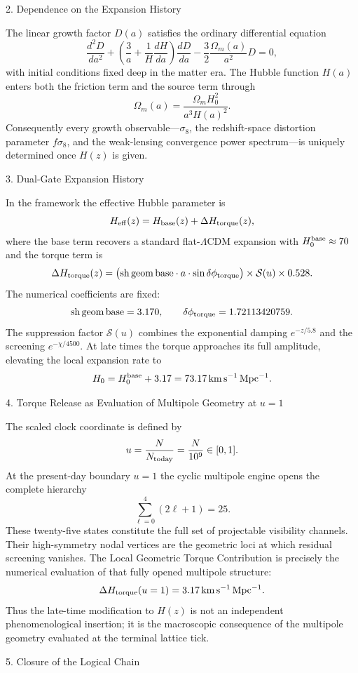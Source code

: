 2. Dependence on the Expansion History

The linear growth factor \(D(a)\) satisfies the ordinary differential equation
\[
\frac{d^2D}{da^2}+\left(\frac{3}{a}+\frac{1}{H}\frac{dH}{da}\right)\frac{dD}{da}-\frac{3}{2}\frac{\Omega_m(a)}{a^2}D=0,
\]  
with initial conditions fixed deep in the matter era. The Hubble function \(H(a)\) enters both the friction term and the source term through
\[
\Omega_m(a)=\frac{\Omega_m H_0^2}{a^3H(a)^2}.
\]  
Consequently every growth observable—\(\sigma_8\), the redshift-space distortion parameter \(f\sigma_8\), and the weak-lensing convergence power spectrum—is uniquely determined once \(H(z)\) is given.

3. Dual-Gate Expansion History

In the framework the effective Hubble parameter is
\[
H_{\rm eff}(z)=H_{\rm base}(z)+\Delta H_{\rm torque}(z),
\]  
where the base term recovers a standard flat-\(\Lambda\)CDM expansion with \(H_0^{\rm base}\approx70\) and the torque term is
\[
\Delta H_{\rm torque}(z)=\bigl({\rm sh\,geom\,base}\cdot a\cdot\sin\delta\phi_{\rm torque}\bigr)\times\mathcal{S}(u)\times0.528.
\]  
The numerical coefficients are fixed:
\[
{\rm sh\,geom\,base}=3.170,\qquad\delta\phi_{\rm torque}=1.72113420759.
\]  
The suppression factor \(\mathcal{S}(u)\) combines the exponential damping \(e^{-z/5.8}\) and the screening \(e^{-\chi/4500}\). At late times the torque approaches its full amplitude, elevating the local expansion rate to
\[
H_0=H_0^{\rm base}+3.17=73.17\,\mathrm{km\,s^{-1}\,Mpc^{-1}}.
\]

4. Torque Release as Evaluation of Multipole Geometry at \(u=1\)

The scaled clock coordinate is defined by
\[
u=\frac{N}{N_{\rm today}}=\frac{N}{10^9}\in[0,1].
\]  
At the present-day boundary \(u=1\) the cyclic multipole engine opens the complete hierarchy
\[
\sum_{\ell=0}^{4}(2\ell+1)=25.
\]  
These twenty-five states constitute the full set of projectable visibility channels. Their high-symmetry nodal vertices are the geometric loci at which residual screening vanishes. The Local Geometric Torque Contribution is precisely the numerical evaluation of that fully opened multipole structure:
\[
\Delta H_{\rm torque}(u=1)=3.17\,\mathrm{km\,s^{-1}\,Mpc^{-1}}.
\]  
Thus the late-time modification to \(H(z)\) is not an independent phenomenological insertion; it is the macroscopic consequence of the multipole geometry evaluated at the terminal lattice tick.

5. Closure of the Logical Chain

